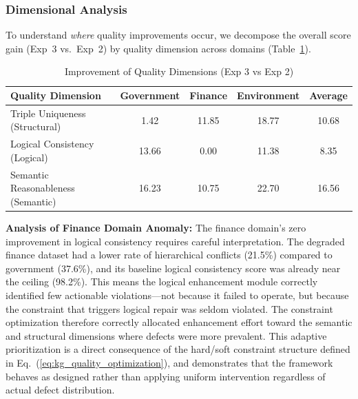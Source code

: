 \documentclass[runningheads]{llncs}
\begin{document}
\subsubsection{Dimensional Analysis}

To understand \textit{where} quality improvements occur, we decompose the overall score gain (Exp~3 vs.\ Exp~2) by quality dimension across domains (Table~\ref{tab:dimension_improvement}).
\begin{table}[H]
    \centering
    \caption{Improvement of Quality Dimensions (Exp 3 vs Exp 2)}
    \label{tab:dimension_improvement}
    \begin{tabular}{l c c c c}
    \toprule
    Quality Dimension & Government & Finance & Environment & Average \\
    \midrule
    Triple Uniqueness (Structural) & 1.42 & 11.85 & 18.77 & 10.68 \\
    Logical Consistency (Logical) & 13.66 & 0.00 & 11.38 & 8.35 \\
    Semantic Reasonableness (Semantic) & 16.23 & 10.75 & 22.70 & 16.56 \\
    \bottomrule
    \end{tabular}
\end{table}

\textbf{Analysis of Finance Domain Anomaly:} The finance domain's zero improvement in logical consistency requires careful interpretation. The degraded finance dataset had a lower rate of hierarchical conflicts (21.5\%) compared to government (37.6\%), and its baseline logical consistency score was already near the ceiling (98.2\%). This means the logical enhancement module correctly identified few actionable violations—not because it failed to operate, but because the constraint that triggers logical repair was seldom violated. The constraint optimization therefore correctly allocated enhancement effort toward the semantic and structural dimensions where defects were more prevalent. This adaptive prioritization is a direct consequence of the hard/soft constraint structure defined in Eq.~(\ref{eq:kg_quality_optimization}), and demonstrates that the framework behaves as designed rather than applying uniform intervention regardless of actual defect distribution.
\end{document}
